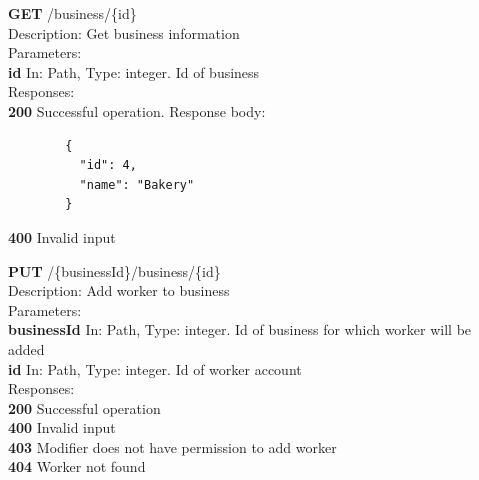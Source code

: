 \documentclass[11pt,a4paper,pdftex]{article}
\begin{document}
\hspace*{1em}\textbf{GET} /business/\{id\}\\
\hspace*{2em}Description: Get business information\\
\hspace*{2em}Parameters:\\
\hspace*{3em}\textbf{id} In: Path, Type: integer. Id of business\\
\hspace*{2em}Responses:\\
\hspace*{3em}\textbf{200} Successful operation. Response body:
\begin{verbatim}
        {
          "id": 4,
          "name": "Bakery"
        }
\end{verbatim}
\hspace*{3em}\textbf{400} Invalid input

\hspace*{1em}\textbf{PUT} /\{businessId\}/business/\{id\}\\
\hspace*{2em}Description: Add worker to business\\
\hspace*{2em}Parameters:\\
\hspace*{3em}\textbf{businessId} In: Path, Type: integer. Id of business for which worker will be added\\
\hspace*{3em}\textbf{id} In: Path, Type: integer. Id of worker account\\
\hspace*{2em}Responses:\\
\hspace*{3em}\textbf{200} Successful operation\\
\hspace*{3em}\textbf{400} Invalid input\\
\hspace*{3em}\textbf{403} Modifier does not have permission to add worker\\
\hspace*{3em}\textbf{404} Worker not found
\end{document}
